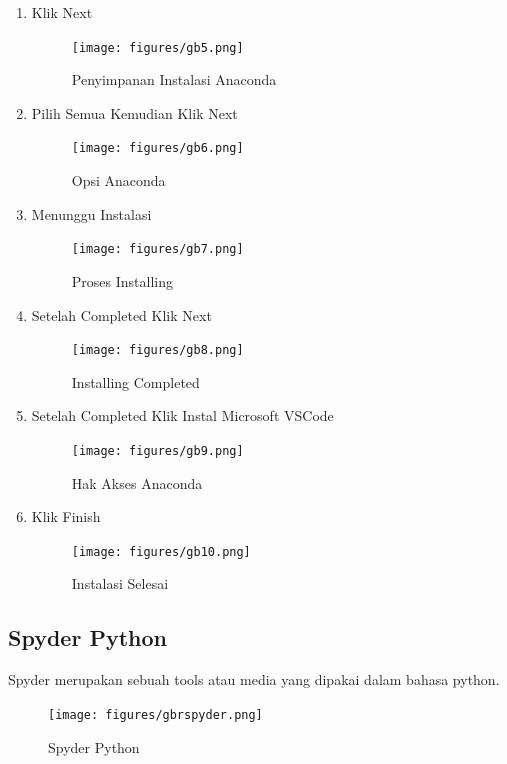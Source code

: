 \begin{enumerate}
    \item Klik Next
    \begin{figure}[!htbp]
        \centering
        \texttt{[image: figures/gb5.png]}
        \caption{Penyimpanan Instalasi Anaconda}
        \label{Penyimpanan}
        \end{figure}

    \item Pilih Semua Kemudian Klik Next
    \begin{figure}[!htbp]
        \centering
        \texttt{[image: figures/gb6.png]}
        \caption{Opsi Anaconda}
        \label{Opsi}
        \end{figure}

    \item Menunggu Instalasi
    \begin{figure}[!htbp]
        \centering
        \texttt{[image: figures/gb7.png]}
        \caption{Proses Installing}
        \label{Proses}
        \end{figure}

    \item Setelah Completed Klik Next
    \begin{figure}[!htbp]
        \centering
        \texttt{[image: figures/gb8.png]}
        \caption{Installing Completed}
        \label{Completed}
        \end{figure}

    \item Setelah Completed Klik Instal Microsoft VSCode
    \begin{figure}[!htbp]
        \centering
        \texttt{[image: figures/gb9.png]}
        \caption{Hak Akses Anaconda}
        \label{Akses}
        \end{figure}

    \item Klik Finish
    \begin{figure}[!htbp]
        \centering
        \texttt{[image: figures/gb10.png]}
        \caption{Instalasi Selesai}
        \label{Selesai}
        \end{figure}
\end{enumerate}
\subsection{Spyder Python}
Spyder merupakan sebuah tools atau media yang dipakai dalam bahasa python.
    \begin{figure}[!htbp]
        \centering
        \texttt{[image: figures/gbrspyder.png]}
        \caption{Spyder Python}
        \label{Spyder}
        \end{figure}

